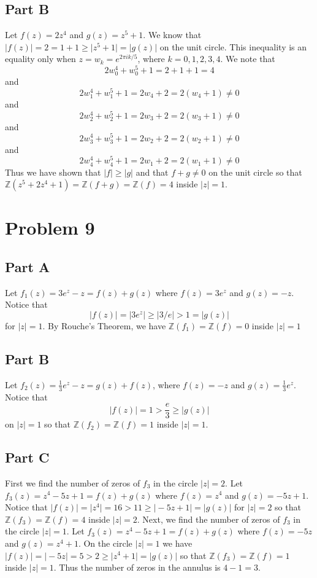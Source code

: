 \documentclass[12pt]{article}
\newcommand{\zz}{\mathbb Z}
\begin{document}
\subsection*{Part B}
Let $f(z) = 2z^4$ and $g(z) = z^5 + 1$. We know that $\vert f (z) \vert = 2 = 1 + 1 \geq \vert z^5 + 1 \vert = \vert g(z) \vert$ on the unit circle. This inequality is an equality only when $z = w_k = e^{2\pi i k/5}$, where $k = 0,1,2,3,4$. We note that
\[
2w_0^4 + w_0^5 + 1 = 2 + 1 + 1 =  4
\] and
\[
2w_1^4 + w_1^5 + 1 = 2w_4 + 2 =  2(w_4 + 1) \neq 0
\] and
\[
2w_2^4 + w_2^5 + 1 = 2w_3 + 2 = 2(w_3 + 1) \neq 0
\] and
\[
2w_3^4 + w_3^5 + 1 = 2w_2 + 2 = 2(w_2 + 1) \neq 0
\] and
\[
2w_4^4 + w_4^5 + 1 = 2w_1 + 2 = 2(w_1+1) \neq 0
\] Thus we have shown that $\vert f \vert \geq \vert g \vert$ and that $f + g \neq 0$ on the unit circle so that $\zz(z^5+2z^4+1) = \zz(f+g) = \zz(f) = 4$ inside $\vert z \vert = 1$.
\newpage
\section*{Problem 9}
\subsection*{Part A}
Let $f_1(z) = 3e^z - z = f(z) + g(z)$ where $f(z) = 3e^z$ and $g(z) = -z$. Notice that 
\[
\vert f(z) \vert = \vert 3e^z \vert \geq \vert 3/e \vert > 1 = \vert g(z)\vert
\] for $\vert z \vert = 1$. By Rouche's Theorem, we have $\zz(f_1) = \zz(f) = 0$ inside $\vert z \vert = 1$
\subsection*{Part B}
Let $f_2(z) = \frac{1}{3}e^z - z = g(z)+f(z)$, where $f(z) = -z$ and $g(z) = \frac{1}{3}e^z$. Notice that
\[
\vert f(z) \vert = 1 > \frac{e}{3} \geq \vert g(z) \vert 
\] on $\vert z \vert = 1$ so that $\zz(f_2) = \zz(f) = 1$ inside $\vert z \vert = 1$.
\subsection*{Part C}
First we find the number of zeros of $f_3$ in the circle $\vert z \vert = 2$. Let $f_3(z) = z^4 - 5z +1 = f(z) + g(z)$ where $f(z) = z^4$ and $g(z) = -5z + 1$. Notice that $\vert f(z) \vert = \vert z^4 \vert = 16 > 11 \geq \vert -5z + 1 \vert = \vert g(z) \vert$ for $\vert z \vert = 2$ so that $\zz(f_3) = \zz(f) = 4$ inside $\vert z \vert = 2$. Next, we find the number of zeros of $f_3$ in the circle $\vert z \vert = 1$. Let $f_3(z) = z^4 - 5z + 1 = f(z) + g(z)$ where $f(z) = -5z$ and $g(z) = z^4 + 1$. On the circle $\vert z \vert = 1$ we have $\vert f(z) \vert = \vert -5z \vert = 5 > 2 \geq \vert z^4 + 1 \vert = \vert g(z) \vert$ so that $\zz(f_3) = \zz(f) = 1$ inside $\vert z \vert = 1$. Thus the number of zeros in the annulus is $4 - 1 = 3$.  
\end{document}
